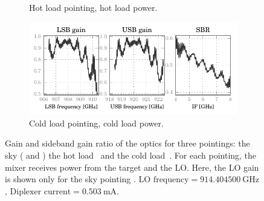 \begin{figure}[p]
\begin{subfigure}[b]{\textwidth}
        \vspace{-.8em}
        \caption{Hot load pointing, hot load power.}
        \label{fig:lsbusbsbr_hothot}
    \end{subfigure}
    \begin{subfigure}[b]{\textwidth}
        \centering
        \includegraphics[scale=.9]{87_00_00_cbb_s_lsbusbsbr}
        \vspace{-.8em}
        \caption{Cold load pointing, cold load power.}
        \label{fig:lsbusbsbr_coldcold}
    \end{subfigure}
    \caption{Gain and sideband gain ratio of the optics for three pointings:
    the sky
    ( and )
    the hot load~
    and the cold load~.
    For each pointing, the mixer receives power from the target and the LO.
    Here, the LO gain is shown only for the sky pointing .
    $\text{LO~frequency} = \SI{914.404500}{\giga\hertz}$,
    $\text{Diplexer current} = \SI{0.503}{\milli\ampere}$.
    }
    \label{fig:87_00_00_sky_lsbusbsbr}
\end{figure}

